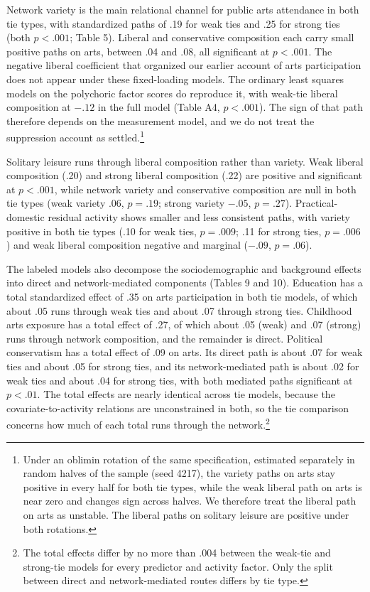 \documentclass[
  12pt
]{article}
\begin{document}
Network variety is the main relational channel for public arts attendance in both tie types, with standardized paths of .19 for weak ties and .25 for strong ties (both $p < .001$; Table 5). Liberal and conservative composition each carry small positive paths on arts, between .04 and .08, all significant at $p < .001$. The negative liberal coefficient that organized our earlier account of arts participation does not appear under these fixed-loading models. The ordinary least squares models on the polychoric factor scores do reproduce it, with weak-tie liberal composition at $-.12$ in the full model (Table A4, $p < .001$). The sign of that path therefore depends on the measurement model, and we do not treat the suppression account as settled.\footnote{Under an oblimin rotation of the same specification, estimated separately in random halves of the sample (seed 4217), the variety paths on arts stay positive in every half for both tie types, while the weak liberal path on arts is near zero and changes sign across halves. We therefore treat the liberal path on arts as unstable. The liberal paths on solitary leisure are positive under both rotations.}

Solitary leisure runs through liberal composition rather than variety. Weak liberal composition (.20) and strong liberal composition (.22) are positive and significant at $p < .001$, while network variety and conservative composition are null in both tie types (weak variety .06, $p = .19$; strong variety $-.05$, $p = .27$). Practical-domestic residual activity shows smaller and less consistent paths, with variety positive in both tie types (.10 for weak ties, $p = .009$; .11 for strong ties, $p = .006$) and weak liberal composition negative and marginal ($-.09$, $p = .06$).

The labeled models also decompose the sociodemographic and background effects into direct and network-mediated components (Tables 9 and 10). Education has a total standardized effect of .35 on arts participation in both tie models, of which about .05 runs through weak ties and about .07 through strong ties. Childhood arts exposure has a total effect of .27, of which about .05 (weak) and .07 (strong) runs through network composition, and the remainder is direct. Political conservatism has a total effect of .09 on arts. Its direct path is about .07 for weak ties and about .05 for strong ties, and its network-mediated path is about .02 for weak ties and about .04 for strong ties, with both mediated paths significant at $p < .01$. The total effects are nearly identical across tie models, because the covariate-to-activity relations are unconstrained in both, so the tie comparison concerns how much of each total runs through the network.\footnote{The total effects differ by no more than .004 between the weak-tie and strong-tie models for every predictor and activity factor. Only the split between direct and network-mediated routes differs by tie type.}
\end{document}
